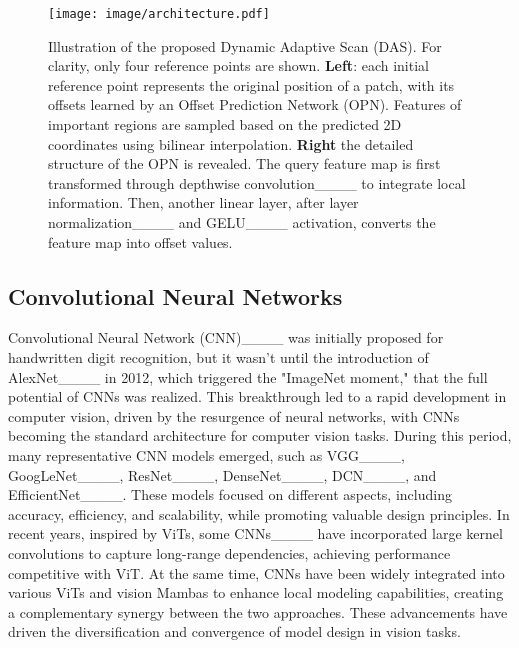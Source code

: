 \begin{figure*}[h]
    \centering
    \texttt{[image: image/architecture.pdf]}
    \vspace{-3mm}
    \caption{Illustration of the proposed Dynamic Adaptive Scan (DAS). For clarity, only four reference points are shown. \textbf{Left}: each initial reference point represents the original position of a patch, with its offsets learned by an Offset Prediction Network (OPN). Features of important regions are sampled based on the predicted 2D coordinates using bilinear interpolation. \textbf{Right} the detailed structure of the OPN is revealed. The query feature map is first transformed through depthwise convolution____ to integrate local information. Then, another linear layer, after layer normalization____ and GELU____ activation, converts the feature map into offset values.}
    \label{fig:das}
    \vspace{-1em}
\end{figure*}
 
\subsection{Convolutional Neural Networks}
Convolutional Neural Network (CNN)____ was initially proposed for handwritten digit recognition, but it wasn't until the introduction of AlexNet____ in 2012, which triggered the "ImageNet moment," that the full potential of CNNs was realized. This breakthrough led to a rapid development in computer vision, driven by the resurgence of neural networks, with CNNs becoming the standard architecture for computer vision tasks. During this period, many representative CNN models emerged, such as VGG____, GoogLeNet____, ResNet____, DenseNet____, DCN____, and EfficientNet____. These models focused on different aspects, including accuracy, efficiency, and scalability, while promoting valuable design principles. In recent years, inspired by ViTs, some CNNs____ have incorporated large kernel convolutions to capture long-range dependencies, achieving performance competitive with ViT. At the same time, CNNs have been widely integrated into various ViTs and vision Mambas to enhance local modeling capabilities, creating a complementary synergy between the two approaches. These advancements have driven the diversification and convergence of model design in vision tasks.